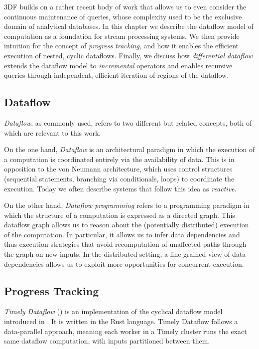 \documentclass[../index.tex]{subfiles}
\begin{document}
3DF builds on a rather recent body of work that allows us to even
consider the continuous maintenance of queries, whose complexity used
to be the exclusive domain of analytical databases. In this chapter we
describe the dataflow model of computation as a foundation for
stream processing systems. We then provide intuition for the concept
of \emph{progress tracking}, and how it enables the efficient
execution of nested, cyclic dataflows. Finally, we discuss how
\emph{differential dataflow} extends the dataflow model to
\emph{incremental} operators and enables recursive queries through
independent, efficient iteration of regions of the dataflow.

\subsection{Dataflow}

\emph{Dataflow}, as commonly used, refers to two different but related
concepts, both of which are relevant to this work.

On the one hand, \emph{Dataflow} is an architectural paradigm in which
the execution of a computation is coordinated entirely via the
availability of data. This is in opposition to the von Neumann
architecture, which uses control structures (sequential statements,
branching via conditionals, loops) to coordinate the execution. Today
we often describe systems that follow this idea as \emph{reactive}.

On the other hand, \emph{Dataflow programming} refers to a programming
paradigm in which the structure of a computation is expressed as a
directed graph. This dataflow graph allows us to reason about the
(potentially distributed) execution of the computation. In particular,
it allows us to infer data dependencies and thus execution strategies
that avoid recomputation of unaffected paths through the graph on new
inputs. In the distributed setting, a fine-grained view of data
dependencies allows us to exploit more opportunities for concurrent
execution.

\subsection{Progress Tracking}

\emph{Timely Dataflow} (\cite{timely}) is an implementation of the
cyclical dataflow model introduced in \cite{murray2013naiad}. It is
written in the Rust language. Timely Dataflow follows a data-parallel
approach, meaning each worker in a Timely cluster runs the exact same
dataflow computation, with inputs partitioned between them.
\end{document}
